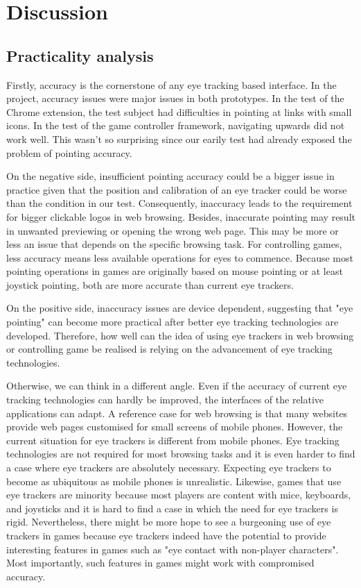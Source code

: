 \documentclass[english]{tktltiki}
\begin{document}
\section{Discussion}

\subsection{Practicality analysis}

Firstly, accuracy is the cornerstone of any eye tracking based interface. In the project, accuracy issues were major issues in both prototypes. In the test of the Chrome extension, the test subject had difficulties in pointing at links with small icons. In the test of the game controller framework, navigating upwards did not work well. This wasn't so surprising since our earily test had already exposed the problem of pointing accuracy. 

On the negative side, insufficient pointing accuracy could be a bigger issue in practice given that the position and calibration of an eye tracker could be worse than the condition in our test. Consequently, inaccuracy leads to the requirement for bigger clickable logos in web browsing. Besides, inaccurate pointing may result in unwanted previewing or opening the wrong web page. This may be more or less an issue that depends on the specific browsing task. For controlling games, less accuracy means less available operations for eyes to commence. Because most pointing operations in games are originally based on mouse pointing or at least joystick pointing, both are more accurate than current eye trackers.

On the positive side, inaccuracy issues are device dependent, suggesting that "eye pointing" can become more practical after better eye tracking technologies are developed. Therefore, how well can the idea of using eye trackers in web browsing or controlling game be realised is relying on the advancement of eye tracking technologies. 

Otherwise, we can think in a different angle. Even if the accuracy of current eye tracking technologies can hardly be improved, the interfaces of the relative applications can adapt. A reference case for web browsing is that many websites provide web pages customised for small screens of mobile phones. However, the current situation for eye trackers is different from mobile phones. Eye tracking technologies are not required for most browsing tasks and it is even harder to find a case where eye trackers are absolutely necessary. Expecting eye trackers to become as ubiquitous as mobile phones is unrealistic. Likewise, games that use eye trackers are minority because most players are content with mice, keyboards, and joysticks and it is hard to find a case in which the need for eye trackers is rigid. Nevertheless, there might be more hope to see a burgeoning use of eye trackers in games because eye trackers indeed have the potential to provide interesting features in games such as "eye contact with non-player characters". Most importantly, such features in games might work with compromised accuracy.
\end{document}
